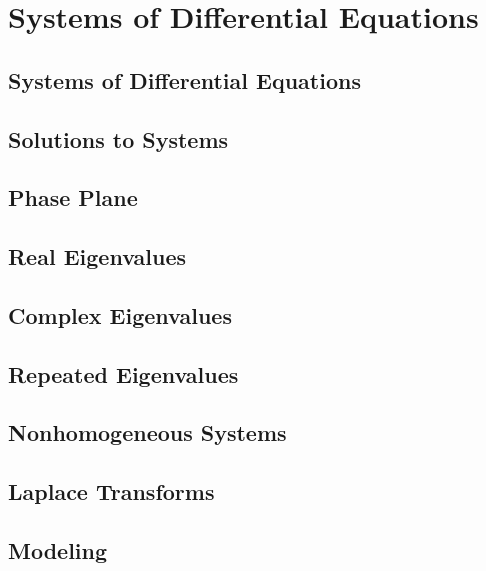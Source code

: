 \documentclass[../satmath.tex]{subfiles}
\begin{document}
\chapter{Systems of Differential Equations}
\section{Systems of Differential Equations}
\section{Solutions to Systems}
\section{Phase Plane}
\section{Real Eigenvalues}
\section{Complex Eigenvalues}
\section{Repeated Eigenvalues}
\section{Nonhomogeneous Systems}
\section{Laplace Transforms}
\section{Modeling}
\end{document}
